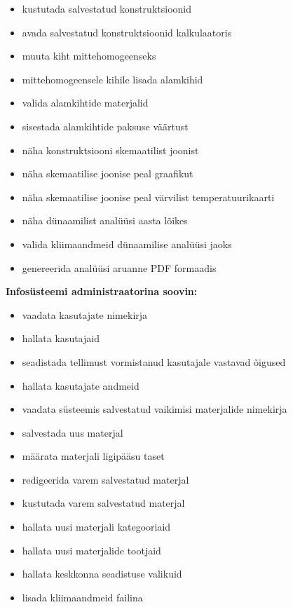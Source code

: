 \begin{itemize}
    \item kustutada salvestatud konstruktsioonid
    \item avada salvestatud konstruktsioonid kalkulaatoris
    \item muuta kiht mittehomogeenseks
    \item mittehomogeensele kihile lisada alamkihid
    \item valida alamkihtide materjalid
    \item sisestada alamkihtide paksuse väärtust
    \item näha konstruktsiooni skemaatilist joonist
    \item näha skemaatilise joonise peal graafikut
    \item näha skemaatilise joonise peal värvilist temperatuurikaarti
    \item näha dünaamilist analüüsi aasta lõikes
    \item valida kliimaandmeid dünaamilise analüüsi jaoks
    \item genereerida analüüsi aruanne PDF formaadis
\end{itemize}



\textbf{Infosüsteemi administraatorina soovin:}
\begin{itemize}

    \item vaadata kasutajate nimekirja
    \item hallata kasutajaid
    \item seadistada tellimust vormistanud kasutajale vastavad õigused
    \item hallata kasutajate andmeid
    \item vaadata süsteemis salvestatud vaikimisi materjalide nimekirja
    \item salvestada uus materjal
    \item määrata materjali ligipääsu taset
    \item redigeerida varem salvestatud materjal
    \item kustutada varem salvestatud materjal
    \item hallata uusi materjali kategooriaid
    \item hallata uusi materjalide tootjaid
    \item hallata keskkonna seadistuse valikuid
    \item lisada kliimaandmeid failina
\end{itemize}

